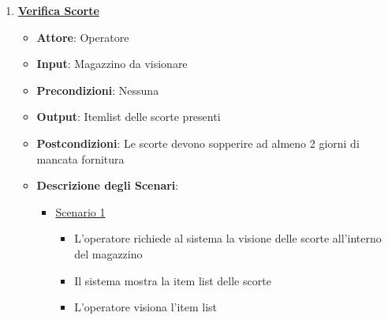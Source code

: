 \begin{enumerate}
\begin{itemize}
\begin{itemize}
\begin{itemize}
                \item Il cassiere inserisce nel sistema la data di inzio e di termine del
                    periodo di valutazione del bilancio
                \item Il sistema avverte l'utente con un messaggio di warning dell'errato
                    inserimento dei dati di Input
            \end{itemize}
            \item \uline{Scenario 3}
            \begin{itemize}
                \item Il cassiere richiede il bilancio
                \item Il cassiere inserisce nel sistema la data di inzio e di termine del
                    periodo di valutazione del bilancio
                \item Il sistema avverte l'utente che il database \`e corrotto
                \item Il sistema effettua un abort
            \end{itemize}
        \end{itemize}
    \end{itemize}
    \item \uline {{\bf Verifica Scorte}}
    \begin{itemize}
        \item {\bf Attore}: Operatore
        \item {\bf Input}: Magazzino da visionare
        \item {\bf Precondizioni}: Nessuna
        \item {\bf Output}: Itemlist delle scorte presenti
        \item {\bf Postcondizioni}: Le scorte devono sopperire ad almeno 2 giorni di mancata
            fornitura
        \item {\bf Descrizione degli Scenari}:
        \begin{itemize}
            \item \uline{Scenario 1}
            \begin{itemize}
                \item L'operatore richiede al sistema la visione delle scorte all'interno del magazzino
                \item Il sistema mostra la item list delle scorte
                \item L'operatore visiona l'item list
            \end{itemize}

\end{itemize}
\end{itemize}
\end{enumerate}
